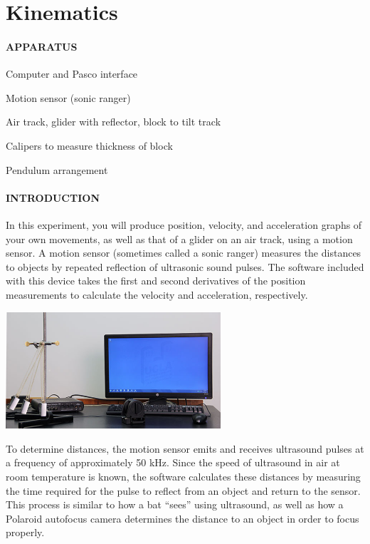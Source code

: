 
\vspace{-5ex}\part*{Kinematics}

\subsection*{APPARATUS}

\vspace{-0.5ex}
\vphantom{.}
\squishlist
\item Computer and Pasco interface
\item Motion sensor (sonic ranger)
\item Air track, glider with reflector, block to tilt track
\item Calipers to measure thickness of block
\item Pendulum arrangement
\squishend

\subsection*{INTRODUCTION}

In this experiment, you will produce position, velocity, and acceleration graphs of your own movements, as well as that of a glider on an air track, using a motion sensor.  A motion sensor (sometimes called a sonic ranger) measures the distances to objects by repeated reflection of ultrasonic sound pulses.  The software included with this device takes the first and second derivatives of the position measurements to calculate the velocity and acceleration, respectively.
\begin{center} \includegraphics*[width=0.6\textwidth]{imgs/6labs/6Alab/6Aexp2/6A_exp2_set-up_new.jpg} \end{center}

To determine distances, the motion sensor emits and receives ultrasound pulses at a frequency of approximately 50 kHz.  Since the speed of ultrasound in air at room temperature is known, the software calculates these distances by measuring the time required for the pulse to reflect from an object and return to the sensor.  This process is similar to how a bat ``sees'' using ultrasound, as well as how a Polaroid autofocus camera determines the distance to an object in order to focus properly.

